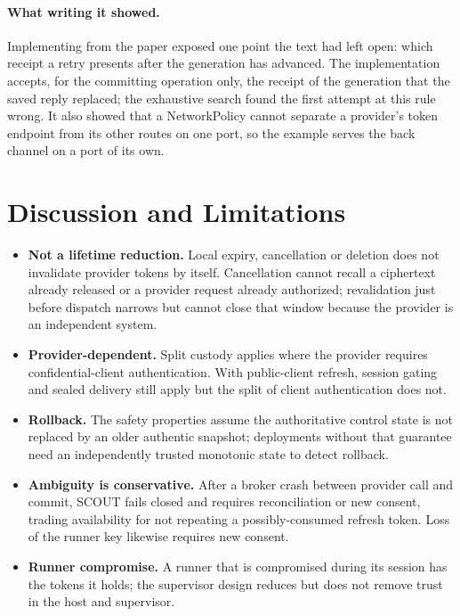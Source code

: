\documentclass[11pt]{article}
\begin{document}
\paragraph{What writing it showed.} Implementing from the paper exposed one point the text had left open: which receipt a retry presents after the generation has advanced. The implementation accepts, for the committing operation only, the receipt of the generation that the saved reply replaced; the exhaustive search found the first attempt at this rule wrong. It also showed that a NetworkPolicy cannot separate a provider's token endpoint from its other routes on one port, so the example serves the back channel on a port of its own.

\section{Discussion and Limitations}
\label{sec:limits}
\begin{itemize}
\item \textbf{Not a lifetime reduction.} Local expiry, cancellation or deletion does not invalidate provider tokens by itself. Cancellation cannot recall a ciphertext already released or a provider request already authorized; revalidation just before dispatch narrows but cannot close that window because the provider is an independent system.
\item \textbf{Provider-dependent.} Split custody applies where the provider requires confidential-client authentication. With public-client refresh, session gating and sealed delivery still apply but the split of client authentication does not.
\item \textbf{Rollback.} The safety properties assume the authoritative control state is not replaced by an older authentic snapshot; deployments without that guarantee need an independently trusted monotonic state to detect rollback.
\item \textbf{Ambiguity is conservative.} After a broker crash between provider call and commit, SCOUT fails closed and requires reconciliation or new consent, trading availability for not repeating a possibly-consumed refresh token. Loss of the runner key likewise requires new consent.
\item \textbf{Runner compromise.} A runner that is compromised during its session has the tokens it holds; the supervisor design reduces but does not remove trust in the host and supervisor.
\end{itemize}
\end{document}
